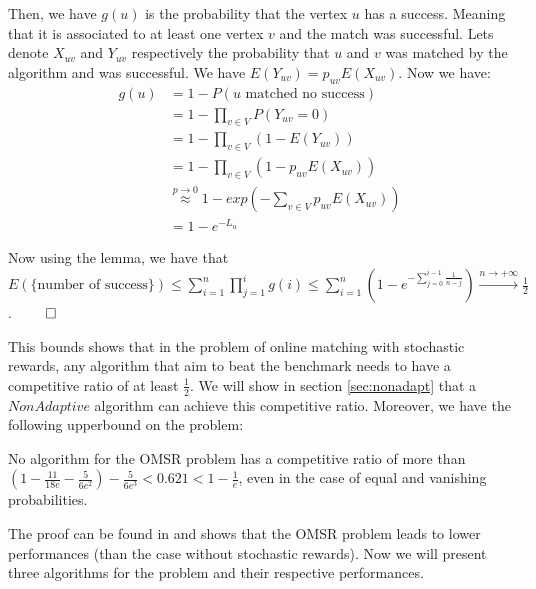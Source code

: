 \documentclass[12pt, twocolumn]{article}
\begin{document}
\par
\hspace{\parindent}Then, we have $g(u)$ is the probability that the vertex $u$ has a success. Meaning that it is associated to at least one vertex $v$ and the match was successful. Lets denote $X_{uv}$ and $Y_{uv}$ respectively the probability that $u$ and $v$ was matched by the algorithm and was successful. We have $E(Y_{uv}) = p_{uv}E(X_{uv})$. Now we have:
\begin{align*}
    g(u) &= 1 - P({u\text{ matched no success}}) \\
         &= 1- \prod_{v \in V} P(Y_{uv}=0) \\
         &= 1- \prod_{v \in V} (1- E(Y_{uv})) \\
         &= 1 -  \prod_{v \in V} (1-p_{uv}E(X_{uv}))\\
         &\overset{p \to 0}{\approx} 1- exp\left(-\sum_{v \in V} p_{uv}E(X_{uv})\right) \\
         &= 1- e^{-L_u}
\end{align*}

\par
\hspace{\parindent}Now using the lemma, we have that $E(\{\text{number of success}\}) \leq \sum_{i=1}^{n} \prod_{j=1}^{i}g(i) \leq \sum_{i=1}^{n} \left( 1 - e^{-\sum_{j=0}^{i-1} \frac{1}{n-j}} \right) \overset{n \to +\infty}{\to} \frac{1}{2}$. $\qed$


\par
\hspace{\parindent}This bounds shows that in the problem of online matching with stochastic rewards, any algorithm that aim to beat the benchmark needs to have a competitive ratio of at least $\frac{1}{2}$. We will show in section \ref{sec:nonadapt} that a $NonAdaptive$ algorithm can achieve this competitive ratio. Moreover, we have the following upperbound on the problem:

\begin{theorem}
No algorithm for the OMSR problem has a competitive ratio of more than $(1 - \frac{11}{18e} - \frac{5}{6e^2}) - \frac{5}{6e^3} < 0.621 < 1 - \frac{1}{e}$, even in the case of equal and vanishing probabilities.
\end{theorem}

\par
\hspace{\parindent}The proof can be found in \cite{mehta2012} and shows that the OMSR problem leads to lower performances (than the case without stochastic rewards). Now we will present three algorithms for the problem and their respective performances.
\end{document}
